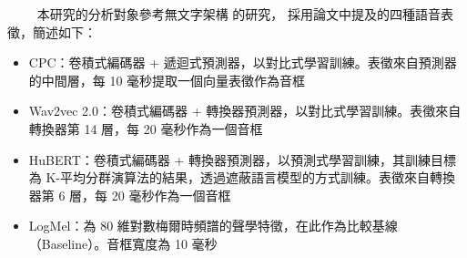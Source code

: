 　　
本研究的分析對象參考無文字架構 \cite{noauthor_textless_2021, lakhotia_generative_2021, lakhotia_generative_2021-1} 的研究，
採用論文中提及的四種語音表徵，簡述如下：

\begin{itemize}
    \item CPC：卷積式編碼器 + 遞迴式預測器，以對比式學習訓練。表徵來自預測器的中間層，每 10 毫秒提取一個向量表徵作為音框
    \item Wav2vec 2.0：卷積式編碼器 + 轉換器預測器，以對比式學習訓練。表徵來自轉換器第 14 層，每 20 毫秒作為一個音框
    \item HuBERT：卷積式編碼器 + 轉換器預測器，以預測式學習訓練，其訓練目標為 K-平均分群演算法的結果，透過遮蔽語言模型的方式訓練。表徵來自轉換器第 6 層，每 20 毫秒作為一個音框
    \item LogMel：為 80 維對數梅爾時頻譜的聲學特徵，在此作為比較基線（Baseline）。音框寬度為 10 毫秒

\end{itemize}


